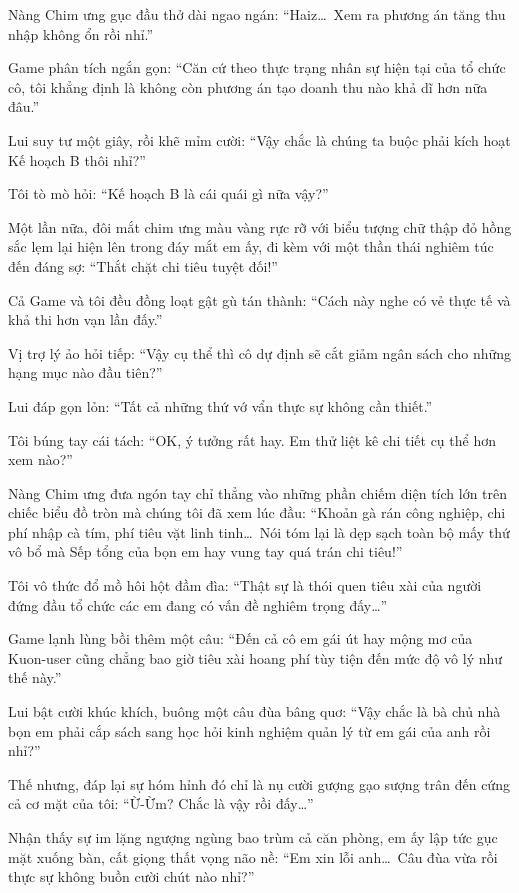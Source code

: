 \documentclass[../main.tex]{subfiles}
\begin{document}
Nàng Chim ưng gục đầu thở dài ngao ngán: ``Haiz\dots\ Xem ra phương án tăng thu nhập không ổn rồi nhỉ.''

Game phân tích ngắn gọn: ``Căn cứ theo thực trạng nhân sự hiện tại của tổ chức cô, tôi khẳng định là không còn phương án tạo doanh thu nào khả dĩ hơn nữa đâu.''

Lui suy tư một giây, rồi khẽ mỉm cười: ``Vậy chắc là chúng ta buộc phải kích hoạt Kế hoạch B thôi nhỉ?''

Tôi tò mò hỏi: ``Kế hoạch B là cái quái gì nữa vậy?''

Một lần nữa, đôi mắt chim ưng màu vàng rực rỡ với biểu tượng chữ thập đỏ hồng sắc lẹm lại hiện lên trong đáy mắt em ấy, đi kèm với một thần thái nghiêm túc đến đáng sợ: ``Thắt chặt chi tiêu tuyệt đối!''

Cả Game và tôi đều đồng loạt gật gù tán thành: ``Cách này nghe có vẻ thực tế và khả thi hơn vạn lần đấy.''

Vị trợ lý ảo hỏi tiếp: ``Vậy cụ thể thì cô dự định sẽ cắt giảm ngân sách cho những hạng mục nào đầu tiên?''

Lui đáp gọn lỏn: ``Tất cả những thứ vớ vẩn thực sự không cần thiết.''

Tôi búng tay cái tách: ``OK, ý tưởng rất hay. Em thử liệt kê chi tiết cụ thể hơn xem nào?''

Nàng Chim ưng đưa ngón tay chỉ thẳng vào những phần chiếm diện tích lớn trên chiếc biểu đồ tròn mà chúng tôi đã xem lúc đầu: ``Khoản gà rán công nghiệp, chi phí nhập cà tím, phí tiêu vặt linh tinh\dots\ Nói tóm lại là dẹp sạch toàn bộ mấy thứ vô bổ mà Sếp tổng của bọn em hay vung tay quá trán chi tiêu!''

Tôi vô thức đổ mồ hôi hột đầm đìa: ``Thật sự là thói quen tiêu xài của người đứng đầu tổ chức các em đang có vấn đề nghiêm trọng đấy\dots''

Game lạnh lùng bồi thêm một câu: ``Đến cả cô em gái út hay mộng mơ của Kuon-user cũng chẳng bao giờ tiêu xài hoang phí tùy tiện đến mức độ vô lý như thế này.''

Lui bật cười khúc khích, buông một câu đùa bâng quơ: ``Vậy chắc là bà chủ nhà bọn em phải cắp sách sang học hỏi kinh nghiệm quản lý từ em gái của anh rồi nhỉ?''

Thế nhưng, đáp lại sự hóm hỉnh đó chỉ là nụ cười gượng gạo sượng trân đến cứng cả cơ mặt của tôi: ``Ừ-Ừm? Chắc là vậy rồi đấy\dots''

Nhận thấy sự im lặng ngượng ngùng bao trùm cả căn phòng, em ấy lập tức gục mặt xuống bàn, cất giọng thất vọng não nề: ``Em xin lỗi anh\dots\ Câu đùa vừa rồi thực sự không buồn cười chút nào nhỉ?''
\end{document}

